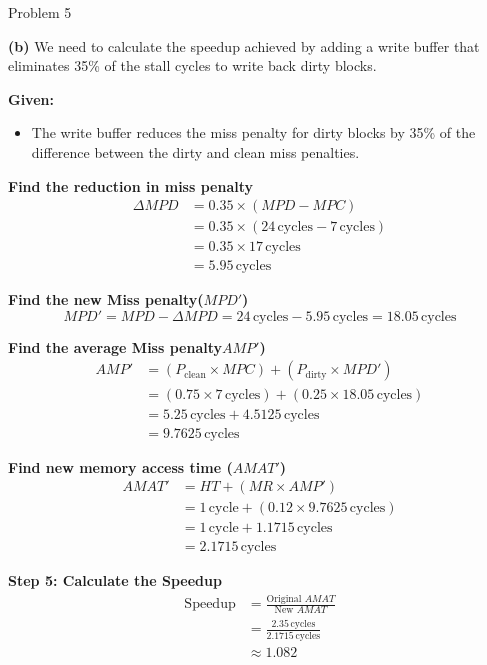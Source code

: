 \begin{problem}{}{Problem 5}
	\vspace{1em}
	
	\textbf{(b)} We need to calculate the speedup achieved by adding a write buffer that eliminates 35\% of the stall cycles to write back dirty blocks.
	
	\textbf{Given:}
	\begin{itemize}
		\item The write buffer reduces the miss penalty for dirty blocks by 35\% of the difference between the dirty and clean miss penalties.
	\end{itemize}
	
	\textbf{Find the reduction in miss penalty}
	\begin{align*}
		\Delta MPD &= 0.35 \times (MPD - MPC) \\
		&= 0.35 \times (24\, \text{cycles} - 7\, \text{cycles}) \\
		&= 0.35 \times 17\, \text{cycles} \\
		&= 5.95\, \text{cycles}
	\end{align*}
	
	\textbf{Find the new Miss penalty(\( MPD' \))}
	\[
	MPD' = MPD - \Delta MPD = 24\, \text{cycles} - 5.95\, \text{cycles} = 18.05\, \text{cycles}
	\]
	
	\textbf{Find the average Miss penalty\( AMP' \))}
	\begin{align*}
		AMP' &= (P_{\text{clean}} \times MPC) + (P_{\text{dirty}} \times MPD') \\
		&= (0.75 \times 7\, \text{cycles}) + (0.25 \times 18.05\, \text{cycles}) \\
		&= 5.25\, \text{cycles} + 4.5125\, \text{cycles} \\
		&= 9.7625\, \text{cycles}
	\end{align*}
	
	\textbf{Find new memory access time (\( AMAT' \))}
	\begin{align*}
		AMAT' &= HT + (MR \times AMP') \\
		&= 1\, \text{cycle} + (0.12 \times 9.7625\, \text{cycles}) \\
		&= 1\, \text{cycle} + 1.1715\, \text{cycles} \\
		&= 2.1715\, \text{cycles}
	\end{align*}
	
	\textbf{Step 5: Calculate the Speedup}
	\begin{align*}
		\text{Speedup} &= \frac{\text{Original } AMAT}{\text{New } AMAT} \\
		&= \frac{2.35\, \text{cycles}}{2.1715\, \text{cycles}} \\
		&\approx 1.082
	\end{align*}
	
\end{problem}
